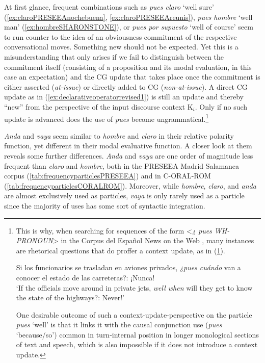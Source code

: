 At first glance, frequent combinations such as \textit{pues claro} `well sure' (\ref{ex:claroPRESEEAnochebuena}, \ref{ex:claroPRESEEAreunis}), \textit{pues hombre} `well man' (\ref{ex:hombreSHARONSTONE}), or \textit{pues por supuesto} `well of course' seem to run counter to the idea of an obviousness commitment of the respective conversational moves. Something new should not be expected. Yet this is a misunderstanding that only arises if we fail to distinguish between the commitment itself (consisting of a proposition and its modal evaluation, in this case an expectation) and the CG update that takes place once the commitment is either asserted (\textit{at-issue}) or directly added to CG (\textit{non-at-issue}). A direct CG update as in (\ref{ex:declarativeoperatorrevised1}) is still an update and thereby ``new'' from the perspective of the input discourse context K$_i$. Only if no such update is advanced does the use of \textit{pues} become ungrammatical.\footnote{This is why, when searching for sequences of the form <\textit{¿ pues WH-PRONOUN}> in the Corpus del Español News on the Web \citep{Davies.20122019}, many instances are rhetorical questions that do proffer a context update, as in (\ref{ex:NOWcarreteras}).

\begin{exe}
		\ex \label{ex:NOWcarreteras} 
		Si los funcionarios se trasladan en aviones privados, \textit{¿pues cuándo} van a conocer el estado de las carreteras?: ¡Nunca! \\
		`If the officials move around in private jets, \textit{well when} will they get to know the state of the highways?: Never!'
\end{exe}
	
One desirable outcome of such a context-update-perspective on the particle \textit{pues} `well' is that it links it with the causal conjunction use (\textit{pues} `because/so') common in turn-internal position in longer monological sections of text and speech, which is also impossible if it does not introduce a context update.}

\textit{Anda} and \textit{vaya} seem similar to \textit{hombre} and \textit{claro} in their relative polarity function, yet different in their modal evaluative function. A closer look at them reveals some further differences. \textit{Anda} and \textit{vaya} are one order of magnitude less frequent than \textit{claro} and \textit{hombre}, both in the PRESEEA Madrid Salamanca corpus (\autoref{tab:frequencyparticlesPRESEEA}) and in C-ORAL-ROM (\autoref{tab:frequencyparticlesCORALROM}). Moreover, while \textit{hombre}, \textit{claro}, and \textit{anda} are almost exclusively used as particles, \textit{vaya} is only rarely used as a particle since the majority of uses has some sort of syntactic integration. 

